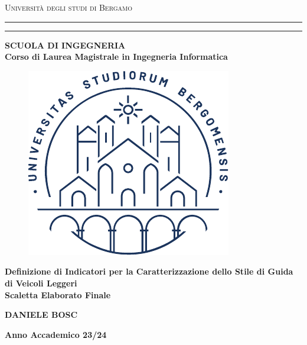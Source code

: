 \thispagestyle{empty}
\begin{titlepage}
\begin{center}
{{\Large{\textsc{Universit\`a degli studi di Bergamo}}}} \rule[0.1cm]{15.8cm}{0.1mm}
\rule[0.5cm]{15.8cm}{0.6mm}
{\small{\bf SCUOLA DI INGEGNERIA\\
Corso di Laurea Magistrale in Ingegneria Informatica}}
\end{center}

\vspace{8mm}
\begin{figure}[h]
    \centering
    \includegraphics{unibg_logo.pdf}
\end{figure}
\vspace{8mm}

\begin{center}
{\LARGE{\bf Definizione di Indicatori per la Caratterizzazione dello Stile di Guida di Veicoli Leggeri\\}}
\vspace{5mm}
{\Large{\bf Scaletta Elaborato Finale}}
\end{center}
\vspace{45mm}
\par
\noindent

\begin{center}
	{{\bf DANIELE BOSC}}
\end{center}
\vspace{15mm}
\begin{center}
{{\bf Anno Accademico 23/24}}
\end{center}    
\end{titlepage}